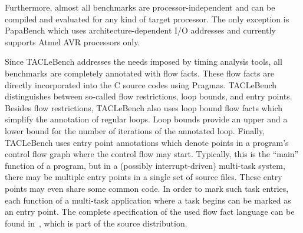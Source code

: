 \documentclass[a4paper,UKenglish]{oasics}
\newcommand{\code}[1]{{\small{\texttt{#1}}}}
\begin{document}
Furthermore, almost all benchmarks are processor-independent and can
be compiled and evaluated for any kind of target processor.
The only exception is PapaBench which uses architecture-dependent
I/O addresses and currently supports Atmel AVR processors only.

Since TACLeBench addresses the needs imposed by timing analysis tools,
all benchmarks are completely annotated with flow facts.
These flow facts are directly incorporated into the C source codes using
Pragmas. %
TACLeBench distinguishes between so-called flow restrictions, loop bounds, and entry points.
Besides flow restrictions, TACLeBench also uses loop bound flow facts which simplify the annotation of regular loops.
Loop bounds provide an upper and a lower bound for the number of iterations of the annotated loop.
%
Finally, TACLeBench uses entry point annotations which denote points in a program's control flow graph where the control flow may start.
Typically, this is the ``main'' function of a program, but in a (possibly interrupt-driven) multi-task system, there may be multiple entry points in a single set of source files.
These entry points may even share some common code.
In order to mark such task entries, each function of a multi-task application where a task begins can be marked as an entry point.
%
%
%
%
The complete specification of the used flow fact language can be found in~\cite{flowfacts},
which is part of the source distribution.
\end{document}
